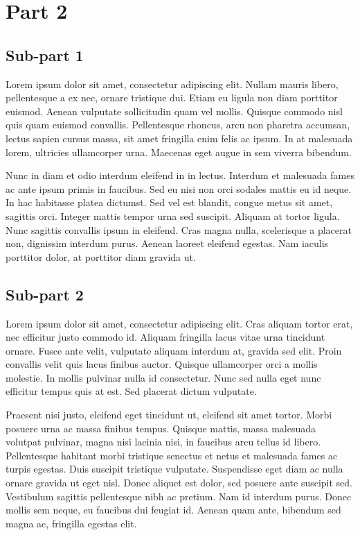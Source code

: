 \documentclass[a4paper,15pt]{article}
\begin{document}
\section{Part 2}

\subsection{Sub-part 1}

Lorem ipsum dolor sit amet, consectetur adipiscing elit. Nullam mauris libero, pellentesque a ex nec, ornare tristique dui. Etiam eu ligula non diam porttitor euismod. Aenean vulputate sollicitudin quam vel mollis. Quisque commodo nisl quis quam euismod convallis. Pellentesque rhoncus, arcu non pharetra accumsan, lectus sapien cursus massa, sit amet fringilla enim felis ac ipsum. In at malesuada lorem, ultricies ullamcorper urna. Maecenas eget augue in sem viverra bibendum.

Nunc in diam et odio interdum eleifend in in lectus. Interdum et malesuada fames ac ante ipsum primis in faucibus. Sed eu nisi non orci sodales mattis eu id neque. In hac habitasse platea dictumst. Sed vel est blandit, congue metus sit amet, sagittis orci. Integer mattis tempor urna sed suscipit. Aliquam at tortor ligula. Nunc sagittis convallis ipsum in eleifend. Cras magna nulla, scelerisque a placerat non, dignissim interdum purus. Aenean laoreet eleifend egestas. Nam iaculis porttitor dolor, at porttitor diam gravida ut.

\subsection{Sub-part 2}

Lorem ipsum dolor sit amet, consectetur adipiscing elit. Cras aliquam tortor erat, nec efficitur justo commodo id. Aliquam fringilla lacus vitae urna tincidunt ornare. Fusce ante velit, vulputate aliquam interdum at, gravida sed elit. Proin convallis velit quis lacus finibus auctor. Quisque ullamcorper orci a mollis molestie. In mollis pulvinar nulla id consectetur. Nunc sed nulla eget nunc efficitur tempus quis at est. Sed placerat dictum vulputate.

Praesent nisi justo, eleifend eget tincidunt ut, eleifend sit amet tortor. Morbi posuere urna ac massa finibus tempus. Quisque mattis, massa malesuada volutpat pulvinar, magna nisi lacinia nisi, in faucibus arcu tellus id libero. Pellentesque habitant morbi tristique senectus et netus et malesuada fames ac turpis egestas. Duis suscipit tristique vulputate. Suspendisse eget diam ac nulla ornare gravida ut eget nisl. Donec aliquet est dolor, sed posuere ante suscipit sed. Vestibulum sagittis pellentesque nibh ac pretium. Nam id interdum purus. Donec mollis sem neque, eu faucibus dui feugiat id. Aenean quam ante, bibendum sed magna ac, fringilla egestas elit.
\end{document}
